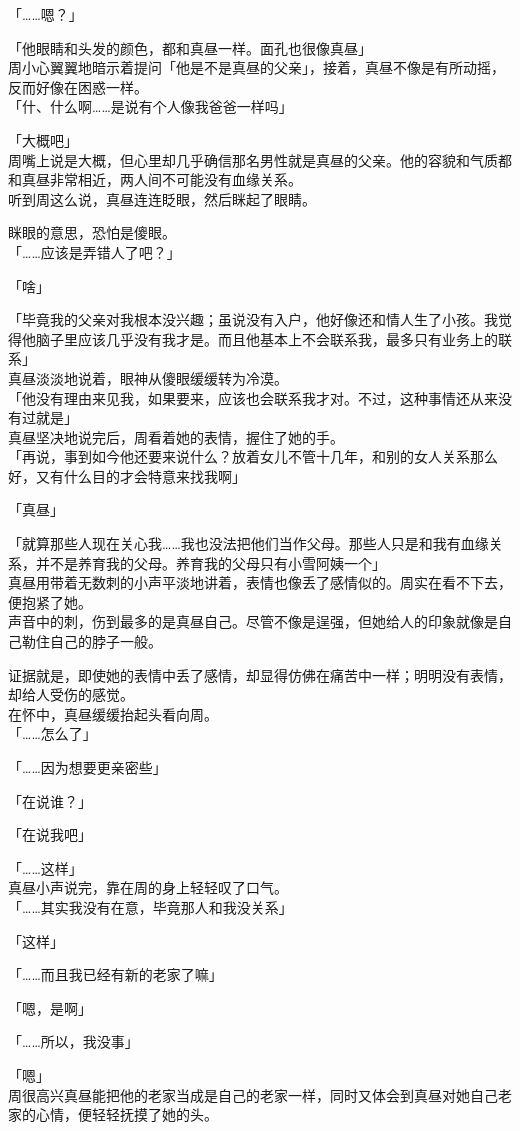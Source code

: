「……嗯？」

「他眼睛和头发的颜色，都和真昼一样。面孔也很像真昼」\\

周小心翼翼地暗示着提问「他是不是真昼的父亲」，接着，真昼不像是有所动摇，反而好像在困惑一样。\\

「什、什么啊……是说有个人像我爸爸一样吗」

「大概吧」\\

周嘴上说是大概，但心里却几乎确信那名男性就是真昼的父亲。他的容貌和气质都和真昼非常相近，两人间不可能没有血缘关系。\\

听到周这么说，真昼连连眨眼，然后眯起了眼睛。

眯眼的意思，恐怕是傻眼。\\

「……应该是弄错人了吧？」

「啥」

「毕竟我的父亲对我根本没兴趣；虽说没有入户，他好像还和情人生了小孩。我觉得他脑子里应该几乎没有我才是。而且他基本上不会联系我，最多只有业务上的联系」\\

真昼淡淡地说着，眼神从傻眼缓缓转为冷漠。\\

「他没有理由来见我，如果要来，应该也会联系我才对。不过，这种事情还从来没有过就是」\\

真昼坚决地说完后，周看着她的表情，握住了她的手。\\

「再说，事到如今他还要来说什么？放着女儿不管十几年，和别的女人关系那么好，又有什么目的才会特意来找我啊」

「真昼」

「就算那些人现在关心我……我也没法把他们当作父母。那些人只是和我有血缘关系，并不是养育我的父母。养育我的父母只有小雪阿姨一个」\\

真昼用带着无数刺的小声平淡地讲着，表情也像丢了感情似的。周实在看不下去，便抱紧了她。\\

声音中的刺，伤到最多的是真昼自己。尽管不像是逞强，但她给人的印象就像是自己勒住自己的脖子一般。

证据就是，即使她的表情中丢了感情，却显得仿佛在痛苦中一样；明明没有表情，却给人受伤的感觉。\\

在怀中，真昼缓缓抬起头看向周。\\

「……怎么了」

「……因为想要更亲密些」

「在说谁？」

「在说我吧」

「……这样」\\

真昼小声说完，靠在周的身上轻轻叹了口气。\\

「……其实我没有在意，毕竟那人和我没关系」

「这样」

「……而且我已经有新的老家了嘛」

「嗯，是啊」

「……所以，我没事」

「嗯」\\

周很高兴真昼能把他的老家当成是自己的老家一样，同时又体会到真昼对她自己老家的心情，便轻轻抚摸了她的头。
